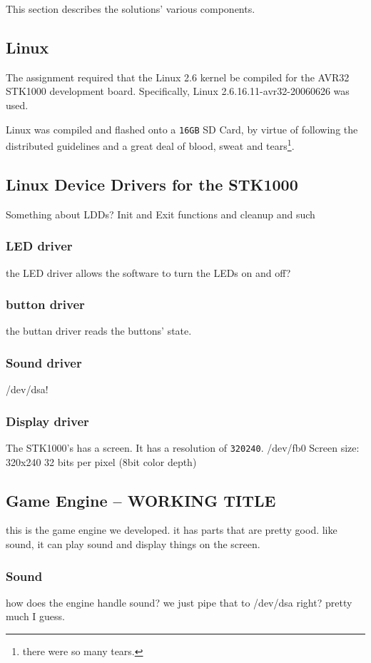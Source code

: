 This section describes the solutions' various components.

\subsection{Linux}
	The assignment required that the Linux 2.6 kernel be compiled for the AVR32 STK1000 development board.
	Specifically, Linux 2.6.16.11-avr32-20060626 was used.

	Linux was compiled and flashed onto a \texttt{16GB} SD Card, by virtue of following the distributed guidelines and a great deal of blood, sweat and tears\footnote{there were so many tears.}.

\subsection{Linux Device Drivers for the STK1000}
	Something about LDDs?
	Init and Exit functions and cleanup and such

	\subsubsection{LED driver}
		the LED driver allows the software to turn the LEDs on and off?
	\subsubsection{button driver}
		the buttan driver reads the buttons' state.	

	\subsubsection{Sound driver}
		/dev/dsa!
	\subsubsection{Display driver}
		The STK1000's has a screen. It has a resolution of \texttt{320}\cross \texttt{240}.
		/dev/fb0
		Screen size: 320x240
		32 bits per pixel (8bit color depth)

\subsection{Game Engine -- WORKING TITLE}
	this is the game engine we developed. it has parts that are pretty good. like sound, it can play sound and display things on the screen.
	\subsubsection{Sound}
		how does the engine handle sound?
		we just pipe that to /dev/dsa right?
		pretty much I guess.
